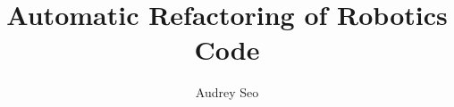 \documentclass[final]{beamer}
\title{Automatic Refactoring of Robotics Code} %
\author{Audrey Seo} %
\institute{REUSE -- ISR} %
\newlength{\sepwid}
\newlength{\onecolwid}
\begin{document}

\setlength{\belowcaptionskip}{2ex} %
\setlength\belowdisplayshortskip{2ex} %

\begin{frame}[t] %

\begin{columns}[t] %

\begin{column}{\sepwid}\end{column} %

\begin{column}{\onecolwid} %




\end{column}
\end{columns}
\end{frame}
\end{document}
